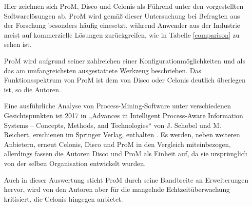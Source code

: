 Hier zeichnen sich ProM, Disco und Celonis als Führend unter den vorgestellten Softwarelösungen ab. ProM wird gemäß dieser Untersuchung bei Befragten aus der Forschung besonders häufig einesetzt, während Anwender aus der Industrie meist auf kommerzielle Lösungen zurückgreifen, wie in Tabelle \ref{comparison} zu sehen ist.

\begin{table}[!h]
\centering
{}
\caption{Angaben von Anwendern zu ihrem Umgang mit Process Mining Software (Quelle: Auszug aus Tabelle 5: Fragenkatalog 5, Verstraete, Comparative Study of Process Mining Software, S. 29 \cite{compPM} }
\label{comparison}
\end{table}

\normalsize
ProM wird aufgrund seiner zahlreichen einer Konfigurationmöglichkeiten und als das am umfangreichsten ausgestattete Werkzeug beschrieben. Das Funktionsspektrum von ProM ist dem von Disco oder Celonis deutlich überlegen ist, so die Autoren. 

Eine ausführliche Analyse von Process-Mining-Software unter verschiedenen Gesichtspunkten ist 2017 in „Advances in Intelligent Process-Aware Information Systems – Concepts, Methods, and Technologies“ von J. Schobel und M. Reichert, erschienen im Springer Verlag, enthalten \cite{Schobel2017}. Es werden, neben weiteren Anbietern, erneut Celonis, Disco und ProM in den Vergleich miteinbezogen, allerdings fassen die Autoren Disco und ProM als Einheit auf, da sie ursprünglich von der selben Organisation entwickelt wurden. 

Auch in dieser Auswertung sticht ProM durch seine Bandbreite an Erweiterungen hervor, wird von den Autoren aber für die mangelnde Echtzeitüberwachung kritisiert, die Celonis hingegen anbietet.

